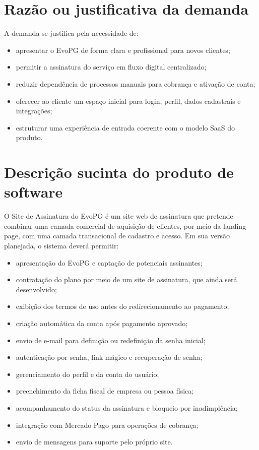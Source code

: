 \documentclass[
  12pt,
  openany,
  oneside,
  a4paper,
  brazil
]{abntex2}
\newcommand{\ProjetoNome}{Site de Assinatura do EvoPG}
\begin{document}
\section{Raz\~ao ou justificativa da demanda}
A demanda se justifica pela necessidade de:
\begin{itemize}
  \item apresentar o EvoPG de forma clara e profissional para novos clientes;
  \item permitir a assinatura do servi\c{c}o em fluxo digital centralizado;
  \item reduzir depend\^encia de processos manuais para cobran\c{c}a e ativa\c{c}\~ao de conta;
  \item oferecer ao cliente um espa\c{c}o inicial para login, perfil, dados cadastrais e integra\c{c}\~oes;
  \item estruturar uma experi\^encia de entrada coerente com o modelo SaaS do produto.
\end{itemize}

\section{Descri\c{c}\~ao sucinta do produto de software}
O \ProjetoNome{} \'e um site web de assinatura que pretende combinar uma camada comercial de aquisi\c{c}\~ao de clientes, por meio da landing page, com uma camada transacional de cadastro e acesso. Em sua vers\~ao planejada, o sistema dever\'a permitir:
\begin{itemize}
  \item apresenta\c{c}\~ao do EvoPG e capta\c{c}\~ao de potenciais assinantes;
  \item contrata\c{c}\~ao do plano por meio de um site de assinatura, que ainda ser\'a desenvolvido;
  \item exibi\c{c}\~ao dos termos de uso antes do redirecionamento ao pagamento;
  \item cria\c{c}\~ao autom\'atica da conta ap\'os pagamento aprovado;
  \item envio de e-mail para defini\c{c}\~ao ou redefini\c{c}\~ao da senha inicial;
  \item autentica\c{c}\~ao por senha, link m\'agico e recupera\c{c}\~ao de senha;
  \item gerenciamento do perfil e da conta do usu\'ario;
  \item preenchimento da ficha fiscal de empresa ou pessoa f\'isica;
  \item acompanhamento do status da assinatura e bloqueio por inadimpl\^encia;
  \item integra\c{c}\~ao com Mercado Pago para opera\c{c}\~oes de cobran\c{c}a;
  \item envio de mensagens para suporte pelo pr\'oprio site.
\end{itemize}
\end{document}
